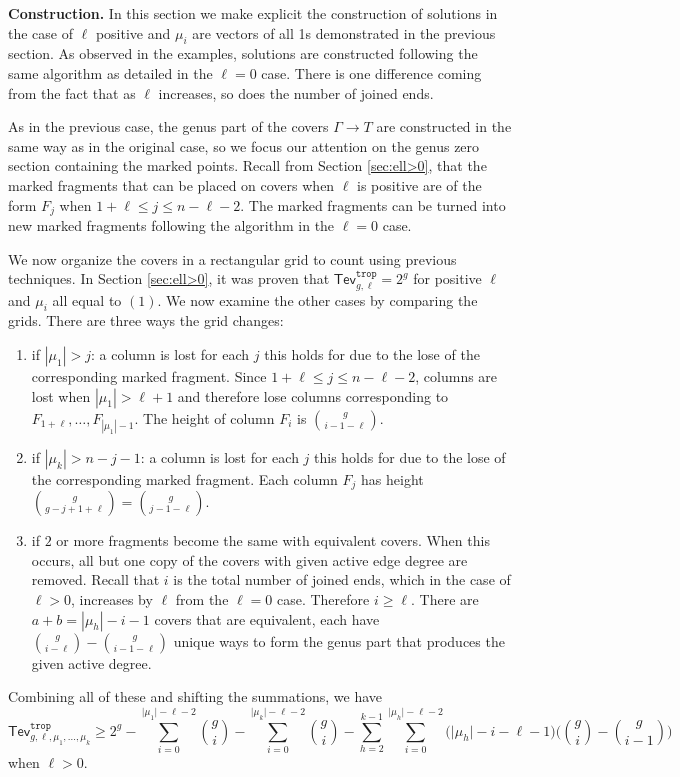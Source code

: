 \documentclass[11pt,reqno]{amsart}
\theoremstyle{definition}
\newcommand\trop{{\mathtt{trop}}}
\newcommand{\Tev}{{\mathsf{Tev}}}
\begin{document}
    
    \vspace{0.5em}
    \noindent\textbf{Construction.}
In this section we make explicit the construction of solutions in the case of $\ell$ positive and $\mu_i$ are vectors of all 1s demonstrated in the previous section. As observed in the examples, solutions are constructed following the same algorithm as detailed in the $\ell=0$ case. There is one difference coming from the fact that as $\ell$ increases, so does the number of joined ends.  

    As in the previous case, the genus part of the covers $\Gamma\to T$ are constructed in the same way as in the original case, so we focus our attention on the genus zero section containing the marked points. Recall from Section \ref{sec:ell>0}, that the marked fragments that can be placed on covers when $\ell$ is positive are of the form $F_j$ when $1+\ell\leq j \leq n-\ell-2$. The marked fragments can be turned into new marked fragments following the algorithm in the $\ell=0$ case.

    We now organize the covers in a rectangular grid to count using previous techniques. In Section \ref{sec:ell>0}, it was proven that $\Tev_{g,\ell}^\trop=2^g$ for positive $\ell$ and $\mu_i$ all equal to $(1)$. We now examine the other cases by comparing the grids. There are three ways the grid changes:
    \begin{enumerate}
    \item if $|\mu_1|>j$: a column is lost for each $j$ this holds for due to the lose of the corresponding marked fragment. Since $1+\ell\leq j\leq n-\ell-2$, columns are lost when $|\mu_1|>\ell+1$ and therefore lose columns corresponding to $F_{1+\ell},\dots,F_{|\mu_1|-1}$. The height of column $F_i$ is ${{g}\choose{i-1-\ell}}$. 
     \item if $|\mu_k|>n-j-1$: a column is lost for each $j$ this holds for due to the lose of the corresponding marked fragment. Each column $F_j$ has height ${{g}\choose{g-j+1+\ell}}={{g}\choose{j-1-\ell}}$.
    \item if $2$ or more fragments become the same with equivalent covers. When this occurs, all but one copy of the covers with given active edge degree are removed. Recall that $i$ is the total number of joined ends, which in the case of $\ell>0$, increases by $\ell$ from the $\ell=0$ case. Therefore $i\geq\ell$. There are $a+b=|\mu_h|-i-1$ covers that are equivalent, each have ${{g}\choose{i-\ell}}-{{g}\choose{i-1-\ell}}$ unique ways to form the genus part that produces the given active degree.
\end{enumerate}
Combining all of these and shifting the summations, we have 
 \begin{equation}
    \Tev^\trop_{g,\ell,\mu_1,\dots,\mu_k}\geq2^g -\sum_{i=0}^{\lvert\mu_1\rvert-\ell-2}{g\choose i}-\sum_{i=0}^{\lvert\mu_k\rvert-\ell-2}{g\choose i}-\sum_{h=2}^{k-1}\sum_{i=0}^{\lvert\mu_h\rvert-\ell-2}\bigg(\lvert\mu_h\rvert-i-\ell-1\bigg)\bigg({g\choose i}-{g \choose i-1}\bigg)
    \end{equation}
 when $\ell>0$.  \\  
    \vspace{0.5em}
            
\end{document}
